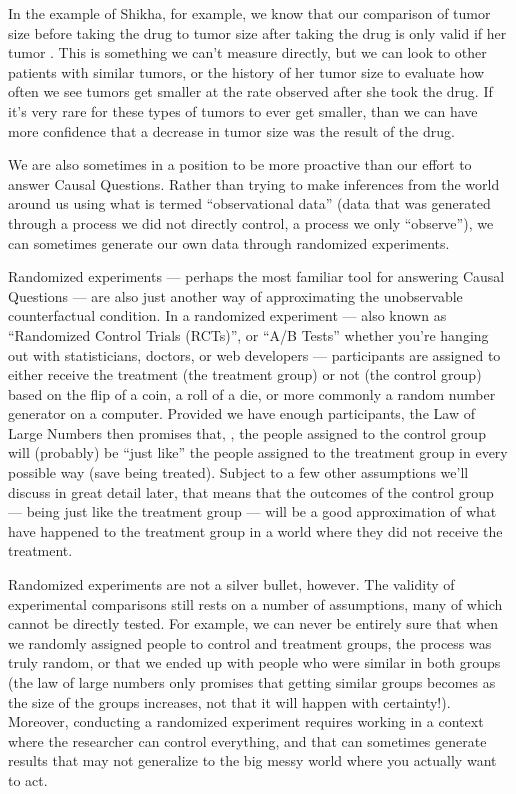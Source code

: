 \documentclass[letterpaper,10pt,english]{jupyterBook}
\begin{document}
\sphinxAtStartPar
In the example of Shikha, for example, we know that our comparison of tumor size before taking the drug to tumor size after taking the drug is only valid if her tumor . This is something we can’t measure directly, but we can look to other patients with similar tumors, or the history of her tumor size to evaluate how often we see tumors get smaller at the rate observed after she took the drug. If it’s very rare for these types of tumors to ever get smaller, than we can have more confidence that a decrease in tumor size was the result of the drug.

\sphinxAtStartPar
We are also sometimes in a position to be more proactive than our effort to answer Causal Questions. Rather than trying to make inferences from the world around us using what is termed “observational data” (data that was generated through a process we did not directly control, a process we only “observe”), we can sometimes generate our own data through randomized experiments.

\sphinxAtStartPar
Randomized experiments — perhaps the most familiar tool for answering Causal Questions — are also just another way of approximating the unobservable counterfactual condition. In a randomized experiment — also known as “Randomized Control Trials (RCTs)”, or “A/B Tests” whether you’re hanging out with statisticians, doctors, or web developers — participants are assigned to either receive the treatment (the treatment group) or not (the control group) based on the flip of a coin, a roll of a die, or more commonly a random number generator on a computer. Provided we have enough participants, the Law of Large Numbers then promises that, , the people assigned to the control group will (probably) be “just like” the people assigned to the treatment group in every possible way (save being treated). Subject to a few other assumptions we’ll discuss in great detail later, that means that the outcomes of the control group — being just like the treatment group  — will be a good approximation of what  have happened to the treatment group in a world where they did not receive the treatment.

\sphinxAtStartPar
Randomized experiments are not a silver bullet, however. The validity of experimental comparisons still rests on a number of assumptions, many of which cannot be directly tested. For example, we can never be entirely sure that when we randomly assigned people to control and treatment groups, the process was truly random, or that we ended up with people who were similar in both groups (the law of large numbers only promises that getting similar groups becomes  as the size of the groups increases, not that it will happen with certainty!). Moreover, conducting a randomized experiment requires working in a context where the researcher can control everything, and that can sometimes generate results that may not generalize to the big messy world where you actually want to act.
\end{document}
